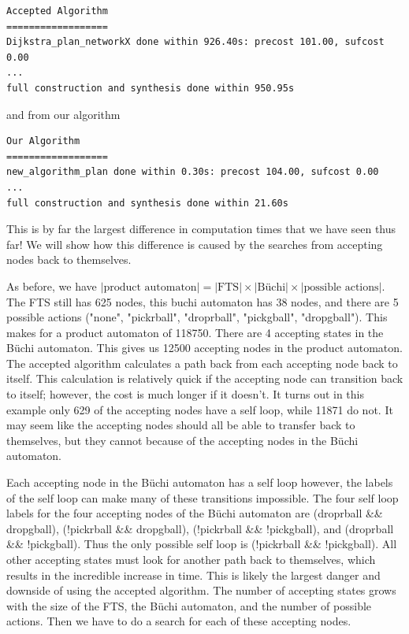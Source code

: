 \begingroup
\fontsize{9pt}{12pt}\selectfont
\begin{lstlisting}
Accepted Algorithm
==================
Dijkstra_plan_networkX done within 926.40s: precost 101.00, sufcost 0.00
...
full construction and synthesis done within 950.95s 
\end{lstlisting}
\endgroup
and from our algorithm
\begingroup
\fontsize{9pt}{12pt}\selectfont
\begin{lstlisting}
Our Algorithm
==================
new_algorithm_plan done within 0.30s: precost 104.00, sufcost 0.00
...
full construction and synthesis done within 21.60s
\end{lstlisting} 
\endgroup

This is by far the largest difference in computation times that we have seen thus far! We will show how this difference is caused by the searches from accepting nodes back to themselves.

As before, we have $|\text{product automaton}| =|\text{FTS}| \times |\text{B\"uchi}| \times |\text{possible actions}|$. The FTS still has 625 nodes, this buchi automaton has 38 nodes, and there are 5 possible actions ("none", "pickrball", "droprball", "pickgball", "dropgball"). This makes for a product automaton of 118750. There are 4 accepting states in the B\"uchi automaton. This gives us 12500 accepting nodes in the product automaton. The accepted algorithm calculates a path back from each accepting node back to itself. This calculation is relatively quick if the accepting node can transition back to itself; however, the cost is much longer if it doesn't. It turns out in this example only 629 of the accepting nodes have a self loop, while 11871 do not. It may seem like the accepting nodes should all be able to transfer back to themselves, but they cannot because of the accepting nodes in the B\"uchi automaton. 

Each accepting node in the B\"uchi automaton has a self loop however, the labels of the self loop can make many of these transitions impossible. The four self loop labels for the four accepting nodes of the B\"uchi automaton are (droprball \&\& dropgball), (!pickrball \&\& dropgball), (!pickrball \&\& !pickgball), and (droprball \&\& !pickgball). Thus the only possible self loop is (!pickrball \&\& !pickgball). All other accepting states must look for another path back to themselves, which results in the incredible increase in time. This is likely the largest danger and downside of using the accepted algorithm. The number of accepting states grows with the size of the FTS, the B\"uchi automaton, and the number of possible actions. Then we have to do a search for each of these accepting nodes.  



